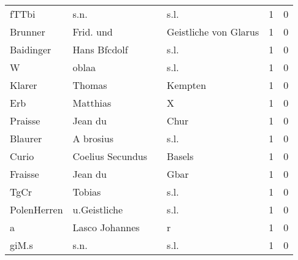 \begin{center}
\begin{tiny}
\begin{longtabu}{llllrr}
                    fTTbi &                               s.n. &             &                                        s.l. &          1 &         0 \\
                  Brunner &                          Frid. und &             &                       Geistliche von Glarus &          1 &         0 \\
                Baidinger &                       Hans Bfcdolf &             &                                        s.l. &          1 &         0 \\
                        W &                              oblaa &             &                                        s.l. &          1 &         0 \\
                   Klarer &                             Thomas &             &                                     Kempten &          1 &         0 \\
                      Erb &                           Matthias &             &                                           X &          1 &         0 \\
                  Praisse &                            Jean du &             &                                        Chur &          1 &         0 \\
                  Blaurer &                          A brosius &             &                                        s.l. &          1 &         0 \\
                    Curio &                   Coelius Secundus &             &                                      Basels &          1 &         0 \\
                  Fraisse &                            Jean du &             &                                        Gbar &          1 &         0 \\
                     TgCr &                             Tobias &             &                                        s.l. &          1 &         0 \\
              PolenHerren &                       u.Geistliche &             &                                        s.l. &          1 &         0 \\
                        a &                     Lasco Johannes &             &                                           r &          1 &         0 \\
                    giM.s &                               s.n. &             &                                        s.l. &          1 &         0 \\

\end{longtabu}
\end{tiny}
\end{center}

